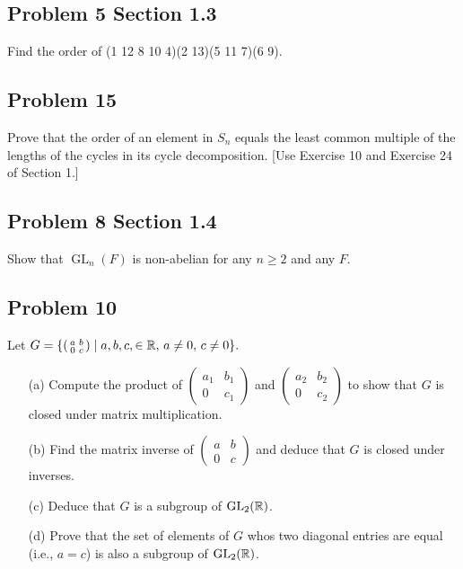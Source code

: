 \subsection{Problem 5 Section 1.3}
\begin{prob}
    Find the order of (1 12 8 10 4)(2 13)(5 11 7)(6 9).
\end{prob}

\subsection{Problem 15}
\begin{prob}
    Prove that the order of an element in $S_n$ equals the least common multiple of the lengths of the cycles in its cycle decomposition. [Use Exercise 10 and Exercise 24 of Section 1.]
\end{prob}

\subsection{Problem 8 Section 1.4}
\begin{prob}
    Show that $\operatorname{GL}_n(F)$ is non-abelian for any $n \geq 2$ and any $F$.
\end{prob}

\subsection{Problem 10}
\begin{prob}
    Let $G=\{\left( \begin{smallmatrix}a&b\\ 0&c\end{smallmatrix}\right) \mid a,b,c,\in \mathbb{R}, \, a \neq 0, \, c \neq 0\}.$ 
    \begin{enumerate}
        \item[(a)] Compute the product of $\left( \begin{smallmatrix}a_1&b_1\\ 0&c_1\end{smallmatrix}\right)$ and $\left( \begin{smallmatrix}a_2&b_2\\ 0&c_2\end{smallmatrix}\right)$ to show that $G$ is closed under matrix multiplication.
        \item[(b)] Find the matrix inverse of $\left( \begin{smallmatrix}a&b\\ 0&c\end{smallmatrix}\right)$ and deduce that $G$ is closed under inverses.
        \item[(c)] Deduce that $G$ is a subgroup of $\operatorname{GL}_2(\mathbb{R})$.
        \item[(d)] Prove that the set of elements of $G$ whos two diagonal entries are equal (i.e., $a=c$) is also a subgroup of $\operatorname{GL}_2(\mathbb{R})$. 
    \end{enumerate}
\end{prob}

